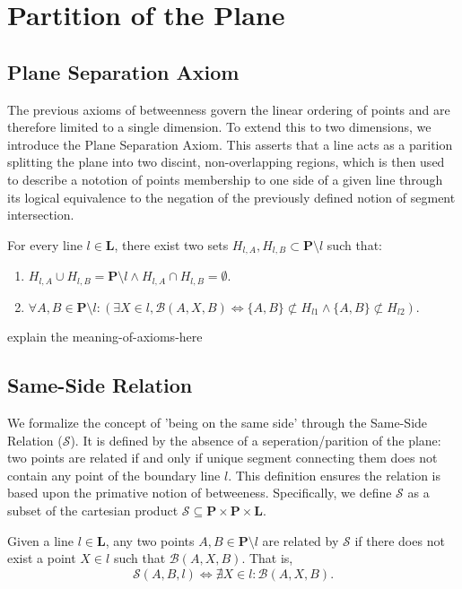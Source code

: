 \documentclass[../../../main/main.tex]{subfiles}
\begin{document}
\chapter{Partition of the Plane}

\section{Plane Separation Axiom}

The previous axioms of betweenness govern the linear ordering of points and are therefore limited to a single dimension. To extend this to two dimensions, we introduce the Plane Separation Axiom. This asserts that a line acts as a parition splitting the plane into two discint, non-overlapping regions, which is then used to describe a nototion of points membership to one side of a given line through its logical equivalence to the negation of the previously defined notion of segment intersection.
\begin{axiom}
For every line $l \in \mathbf{L}$, there exist two sets $H_{l,A}, H_{l,B} \subset \mathbf{P} \setminus l$ such that:
\begin{enumerate}
    \item $H_{l,A} \cup H_{l,B} = \mathbf{P} \setminus l \land H_{l,A} \cap H_{l,B} = \emptyset$.
    \item $\forall A, B \in \mathbf{P} \setminus l \colon \left( \exists X \in l, \mathcal{B}(A, X, B) \iff \{A, B\} \not\subset H_{l1} \land \{A, B\} \not\subset H_{l2} \right)$.
\end{enumerate}
\end{axiom}

explain the meaning-of-axioms-here

\section{Same-Side Relation}
We formalize the concept of 'being on the same side' through the Same-Side Relation ($\mathcal{S}$). It is defined by the absence of a seperation/parition of the plane: two points are related if and only if unique segment connecting them does not contain any point of the boundary line $l$. This definition ensures the relation is based upon the primative notion of betweeness.
Specifically, we define $\mathcal{S}$ as a subset of the cartesian product $\mathcal{S} \subseteq \mathbf{P} \times \mathbf{P} \times \mathbf{L}$.
\begin{definition}
    Given a line $l \in \mathbf{L}$, any two points $A, B \in \mathbf{P} \setminus {l}$ are related by $\mathcal{S}$ if there does not exist a point $X \in l$ such that $\mathcal{B}(A, X, B)$. That is,
    \[
    \mathcal{S}(A, B, l) \iff \nexists X \in l \colon \mathcal{B}(A, X, B).
    \]
\end{definition}
\end{document}

